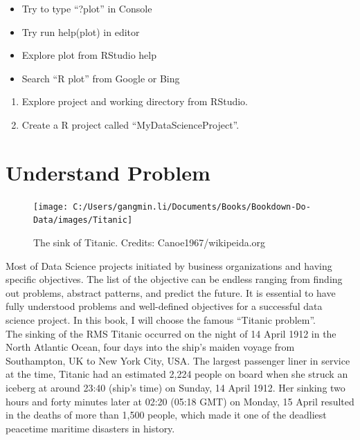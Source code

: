 \documentclass[
]{book}
\providecommand{\tightlist}{%
  \setlength{\itemsep}{0pt}\setlength{\parskip}{0pt}}
\begin{document}
\begin{itemize}
\tightlist
\item
  Try to type ``?plot'' in Console
\item
  Try run help(plot) in editor
\item
  Explore plot from RStudio help
\item
  Search ``R plot'' from Google or Bing
\end{itemize}

\begin{enumerate}
\def\labelenumi{\arabic{enumi}.}
\setcounter{enumi}{3}
\item
  Explore project and working directory from RStudio.
\item
  Create a R project called ``MyDataScienceProject''.
\end{enumerate}

\hypertarget{prob}{%
\chapter{Understand Problem}\label{prob}}

\begin{figure}

{\centering \texttt{[image: C:/Users/gangmin.li/Documents/Books/Bookdown-Do-Data/images/Titanic]} 

}

\caption{The sink of Titanic. Credits: Canoe1967/wikipeida.org}\label{fig:unnamed-chunk-1}
\end{figure}

Most of Data Science projects initiated by business organizations and having specific objectives. The list of the objective can be endless ranging from finding out problems, abstract patterns, and predict the future. It is essential to have fully understood problems and well-defined objectives for a successful data science project. In this book, I will choose the famous ``Titanic problem''.\\
The sinking of the RMS Titanic occurred on the night of 14 April 1912 in the North Atlantic Ocean, four days into the ship's maiden voyage from Southampton, UK to New York City, USA. The largest passenger liner in service at the time, Titanic had an estimated 2,224 people on board when she struck an iceberg at around 23:40 (ship's time) on Sunday, 14 April 1912. Her sinking two hours and forty minutes later at 02:20 (05:18 GMT) on Monday, 15 April resulted in the deaths of more than 1,500 people, which made it one of the deadliest peacetime maritime disasters in history.
\end{document}
